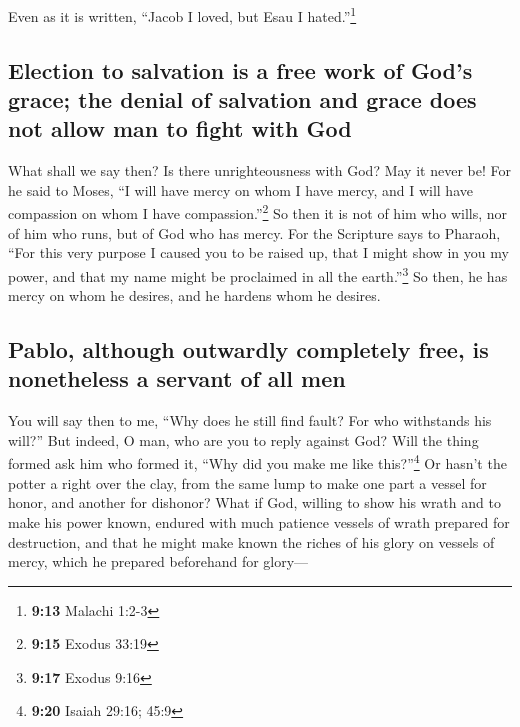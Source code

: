 Even as it is written, ``Jacob I loved, but Esau I
hated.''\footnote{\textbf{9:13} Malachi 1:2-3}

\hypertarget{election-to-salvation-is-a-free-work-of-gods-grace-the-denial-of-salvation-and-grace-does-not-allow-man-to-fight-with-god}{%
\subsection{Election to salvation is a free work of God's grace; the
denial of salvation and grace does not allow man to fight with
God}\label{election-to-salvation-is-a-free-work-of-gods-grace-the-denial-of-salvation-and-grace-does-not-allow-man-to-fight-with-god}}

 What shall we say then? Is there unrighteousness with
God? May it never be!  For he said to Moses, ``I will
have mercy on whom I have mercy, and I will have compassion on whom I
have compassion.''\footnote{\textbf{9:15} Exodus 33:19} 
So then it is not of him who wills, nor of him who runs, but of God who
has mercy.  For the Scripture says to Pharaoh, ``For this
very purpose I caused you to be raised up, that I might show in you my
power, and that my name might be proclaimed in all the
earth.''\footnote{\textbf{9:17} Exodus 9:16}  So then, he
has mercy on whom he desires, and he hardens whom he desires.

\hypertarget{pablo-although-outwardly-completely-free-is-nonetheless-a-servant-of-all-men}{%
\subsection{Pablo, although outwardly completely free, is nonetheless a
servant of all
men}\label{pablo-although-outwardly-completely-free-is-nonetheless-a-servant-of-all-men}}

 You will say then to me, ``Why does he still find fault?
For who withstands his will?''  But indeed, O man, who
are you to reply against God? Will the thing formed ask him who formed
it, ``Why did you make me like this?''\footnote{\textbf{9:20} Isaiah
  29:16; 45:9}  Or hasn't the potter a right over the
clay, from the same lump to make one part a vessel for honor, and
another for dishonor?  What if God, willing to show his
wrath and to make his power known, endured with much patience vessels of
wrath prepared for destruction,  and that he might make
known the riches of his glory on vessels of mercy, which he prepared
beforehand for glory---

